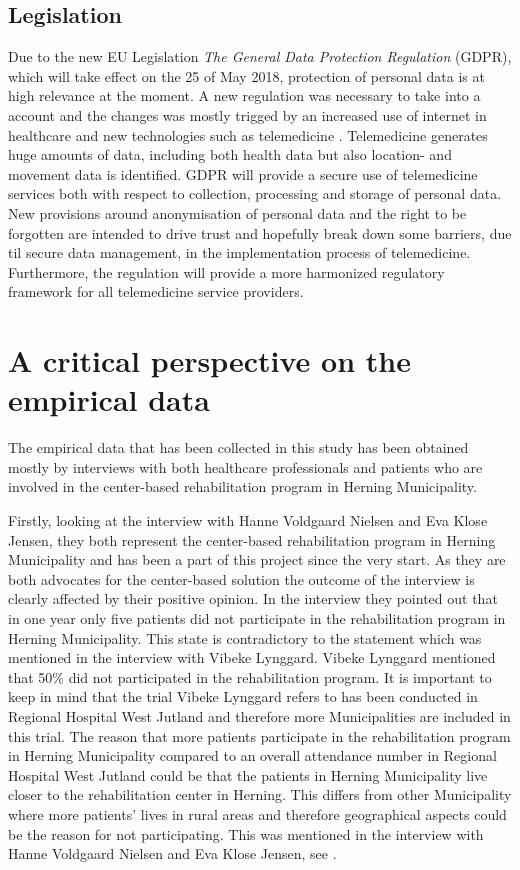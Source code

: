 \subsection{Legislation} 
Due to the new EU Legislation \textit{The General Data Protection Regulation} (GDPR), which will take effect on the 25 of May 2018, protection of personal data is at high relevance at the moment. A new regulation was necessary to take into a account and the changes was mostly trigged by an increased use of internet in healthcare and new technologies such as telemedicine \cite{GDPR}. Telemedicine generates huge amounts of data, including both health data but also location- and movement data is identified. GDPR will provide a secure use of telemedicine services both with respect to collection, processing and storage of personal data. New provisions around anonymisation of personal data and the right to be forgotten are intended to drive trust and hopefully break down some barriers, due til secure data management, in the implementation process of telemedicine. Furthermore, the regulation will provide a more harmonized regulatory framework for all telemedicine service providers.   

\section{A critical perspective on the empirical data}
 
 The empirical data that has been collected in this study has been obtained mostly by interviews with both healthcare professionals and patients who are involved in the center-based rehabilitation program in Herning Municipality. 

Firstly, looking at the interview with Hanne Voldgaard Nielsen and Eva Klose Jensen, they both represent the center-based rehabilitation program in Herning Municipality and has been a part of this project since the very start. As they are both advocates for the center-based solution the outcome of the interview is clearly affected by their positive opinion. In the interview they pointed out that in one year only five patients did not participate in the rehabilitation program in Herning Municipality. This state is contradictory to the statement which was mentioned in the interview with Vibeke Lynggard. Vibeke Lynggard mentioned that 50\% did not participated in the rehabilitation program. It is important to keep in mind that the trial Vibeke Lynggard refers to has been conducted in Regional Hospital West Jutland and therefore more Municipalities are included in this trial. The reason that more patients participate in the rehabilitation program in Herning Municipality compared to an overall attendance number in Regional Hospital West Jutland could be that the patients in Herning Municipality live closer to the rehabilitation center in Herning. This differs from other Municipality where more patients’ lives in rural areas and therefore geographical aspects could be the reason for not participating. This was mentioned in the interview with Hanne Voldgaard Nielsen and Eva Klose Jensen, see .    

